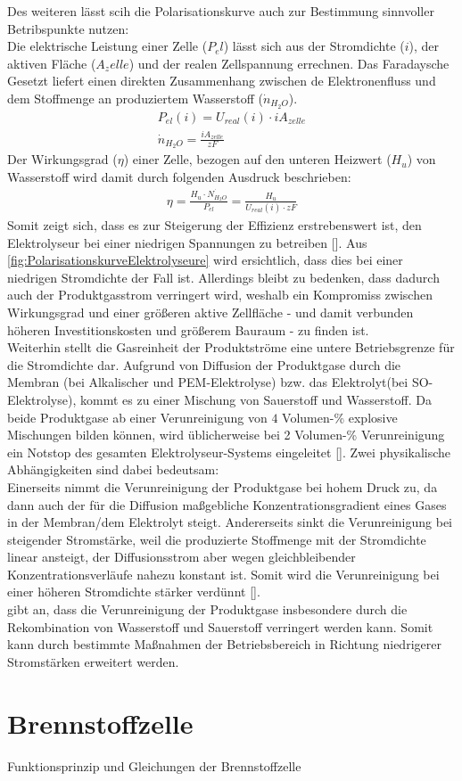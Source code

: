 Des weiteren lässt scih die Polarisationskurve auch zur Bestimmung sinnvoller Betribspunkte nutzen:\\
Die elektrische Leistung einer Zelle ($P_el$) lässt sich aus der Stromdichte ($i$), der aktiven Fläche ($A_zelle$) und der realen Zellspannung errechnen. Das Faradaysche Gesetzt liefert einen direkten Zusammenhang zwischen de Elektronenfluss und dem Stoffmenge an produziertem Wasserstoff ($\dot{n}_{H_2O}$).
\begin{align}
	P_{el}(i) = U_{real}(i)\cdot i A_{zelle}\\
	\dot{n}_{H_2O} = \frac{i A_{zelle}}{zF}
\end{align}
Der Wirkungsgrad ($\eta$) einer Zelle, bezogen auf den unteren Heizwert ($H_u$) von Wasserstoff wird damit durch folgenden Ausdruck beschrieben:
\begin{align}
	\eta = \frac{H_u \cdot\dot{N_{H_2O}}}{P_{el}} = \frac{H_u}{U_{real}(i)\cdot{zF}}
\end{align}
Somit zeigt sich, dass es zur Steigerung der Effizienz erstrebenswert ist, den Elektrolyseur bei einer niedrigen Spannungen zu betreiben [\cite{A semiempirical study of the temperature dependence of the anode charge transfer coefficient of a 6 kW PEM electrolyzer}]. Aus \ref{fig:PolarisationskurveElektrolyseure} wird ersichtlich, dass dies bei einer niedrigen Stromdichte der Fall ist. Allerdings bleibt zu bedenken, dass dadurch auch der Produktgasstrom verringert wird, weshalb ein Kompromiss zwischen Wirkungsgrad und einer größeren aktive Zellfläche - und damit verbunden höheren Investitionskosten und größerem Bauraum - zu finden ist.\\
Weiterhin stellt die Gasreinheit der Produktströme eine untere Betriebsgrenze für die Stromdichte dar. Aufgrund von Diffusion der Produktgase durch die Membran (bei Alkalischer und PEM-Elektrolyse) bzw. das Elektrolyt(bei SO-Elektrolyse), kommt es zu einer Mischung von Sauerstoff und Wasserstoff. Da beide Produktgase ab einer Verunreinigung von $4$ Volumen-\% explosive Mischungen bilden können, wird üblicherweise bei 2 Volumen-\% Verunreinigung ein Notstop des gesamten Elektrolyseur-Systems eingeleitet [\cite{Alkaline Water Electrolysis Powered by Renewable Energy: A Review}]. Zwei physikalische  Abhängigkeiten sind dabei bedeutsam:\\ 
Einerseits nimmt die Verunreinigung der Produktgase bei hohem Druck zu, da dann auch der für die Diffusion maßgebliche Konzentrationsgradient eines Gases in der Membran/dem Elektrolyt steigt.
Andererseits sinkt die Verunreinigung bei steigender Stromstärke, weil die produzierte Stoffmenge mit der Stromdichte linear ansteigt, der Diffusionsstrom aber wegen gleichbleibender Konzentrationsverläufe  nahezu konstant ist. Somit wird die Verunreinigung bei einer höheren Stromdichte stärker verdünnt [\cite{Alkaline Water Electrolysis Powered by Renewable Energy: A Review}].\\
\cite{High-pressure PEM water electrolysis and corresponding safety issues} gibt an, dass die Verunreinigung der Produktgase insbesondere durch die Rekombination von Wasserstoff und Sauerstoff verringert werden kann.  Somit kann durch bestimmte Maßnahmen der Betriebsbereich in Richtung niedrigerer Stromstärken erweitert werden.
\section{Brennstoffzelle}
Funktionsprinzip und Gleichungen der Brennstoffzelle

